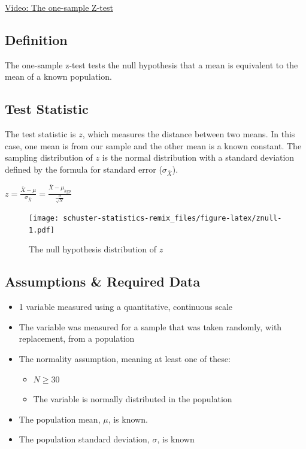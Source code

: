 \documentclass[
]{book}
\providecommand{\tightlist}{%
  \setlength{\itemsep}{0pt}\setlength{\parskip}{0pt}}
\begin{document}
\href{https://youtu.be/TE61rB6ajTY}{Video: The one-sample Z-test}

\hypertarget{definition}{%
\subsection{Definition}\label{definition}}

The one-sample z-test tests the null hypothesis that a mean is equivalent to the mean of a known population.

\hypertarget{test-statistic}{%
\subsection{Test Statistic}\label{test-statistic}}

The test statistic is \(z\), which measures the distance between two means. In this case, one mean is from our sample and the other mean is a known constant. The sampling distribution of \(z\) is the normal distribution with a standard deviation defined by the formula for standard error (\(\sigma_{\bar{X}}\)).

\(z = \frac{\bar{X}-\mu}{\sigma_{\bar{X}}} = \frac{\bar{X}-\mu_{hyp}}{\frac{\sigma}{\sqrt{N}}}\)

\begin{figure}
\centering
\texttt{[image: schuster-statistics-remix\_files/figure-latex/znull-1.pdf]}
\caption{\label{fig:znull}The null hypothesis distribution of \(z\)}
\end{figure}

\hypertarget{assumptions-required-data}{%
\subsection{Assumptions \& Required Data}\label{assumptions-required-data}}

\begin{itemize}
\tightlist
\item
  1 variable measured using a quantitative, continuous scale
\item
  The variable was measured for a sample that was taken randomly, with replacement, from a population
\item
  The normality assumption, meaning at least one of these:

  \begin{itemize}
  \tightlist
  \item
    \(N \ge 30\)
  \item
    The variable is normally distributed in the population
  \end{itemize}
\item
  The population mean, \(\mu\), is known.
\item
  The population standard deviation, \(\sigma\), is known
\end{itemize}
\end{document}
